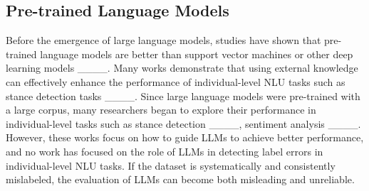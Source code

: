 \subsection{Pre-trained Language Models}
Before the emergence of large language models, studies have shown that pre-trained language models are better than support vector machines or other deep learning models ____. Many works demonstrate that using external knowledge can effectively enhance the performance of individual-level NLU tasks such as stance detection tasks ____. Since large language models were pre-trained with a large corpus, many researchers began to explore their performance in individual-level tasks such as stance detection ____, sentiment analysis ____.  However, these works focus on how to guide LLMs to achieve better performance, and no work has focused on the role of LLMs in detecting label errors in individual-level NLU tasks. If the dataset is systematically and consistently mislabeled, the evaluation of LLMs can become both misleading and unreliable.